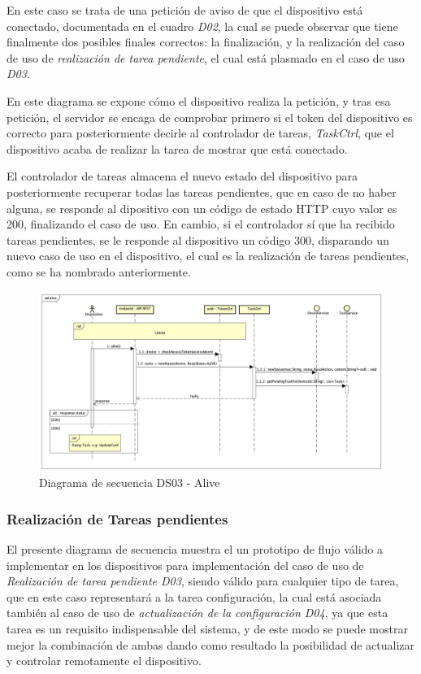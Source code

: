 En este caso se trata de una petición de aviso de que el dispositivo está conectado, documentada en el cuadro \textit{D02}, la cual se puede observar que tiene finalmente dos posibles finales correctos: la finalización, y la realización del caso de uso de \textit{realización de tarea pendiente}, el cual está plasmado en el caso de uso \textit{D03}.

En este diagrama se expone cómo el dispositivo realiza la petición, y tras esa petición, el servidor se encaga de comprobar primero si el token del dispositivo es correcto para posteriormente decirle al controlador de tareas, \textit{TaskCtrl}, que el dispositivo acaba de realizar la tarea de mostrar que está conectado.

El controlador de tareas almacena el nuevo estado del dispositivo para posteriormente recuperar todas las tareas pendientes, que en caso de no haber alguna, se responde al dipositivo con un código de estado HTTP cuyo valor es 200, finalizando el caso de uso.
En cambio, si el controlador sí que ha recibido tareas pendientes, se le responde al dispositivo un código 300, disparando un nuevo caso de uso en el dispositivo, el cual es la realización de tareas pendientes, como se ha nombrado anteriormente.

\begin{figure}[H]
    \centering
    \includegraphics[width=14cm]{./img/sequence/diagram/alive.png}
    \caption{Diagrama de secuencia DS03 - Alive}
    \label{fig:seq.alive}
\end{figure}

\subsubsection{Realización de Tareas pendientes}

El presente diagrama de secuencia muestra el un prototipo de flujo válido a implementar en los dispositivos para implementación del caso de uso de \textit{Realización de tarea pendiente D03}, siendo válido para cualquier tipo de tarea, que en este caso representará a la tarea configuración, la cual está asociada también al caso de uso de \textit{actualización de la configuración D04}, ya que esta tarea es un requisito indispensable del sistema, y de este modo se puede mostrar mejor la combinación de ambas dando como resultado la posibilidad de actualizar y controlar remotamente el dispositivo.

